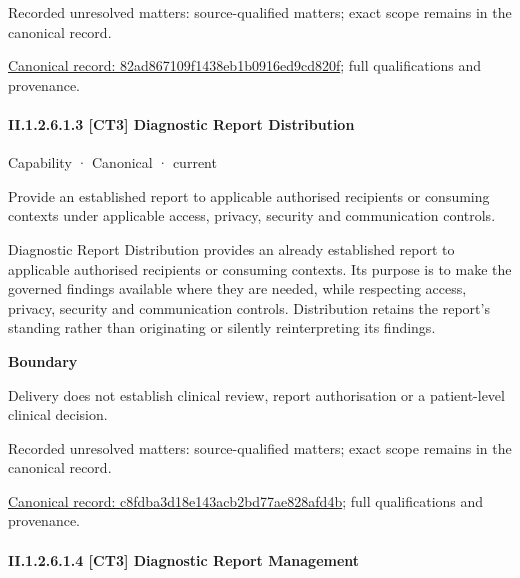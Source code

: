 {\small Recorded unresolved matters: source-qualified matters; exact scope remains in the canonical record.}\par
{\footnotesize \href{../../../../continuum/strategy/capability/82ad867109f1438eb1b0916ed9cd820f.md}{Canonical record: 82ad867109f1438eb1b0916ed9cd820f}; full qualifications and provenance.}\par
\paragraph*{II.1.2.6.1.3 [CT3] Diagnostic Report Distribution}
\label{navigation:II.1.2.6.1.3}

\label{element:c8fdba3d18e143acb2bd77ae828afd4b}
{\small Capability · Canonical · current}\par

Provide an established report to applicable authorised recipients or consuming contexts under applicable access, privacy, security and communication controls.



Diagnostic Report Distribution provides an already established report to applicable authorised recipients or consuming contexts. Its purpose is to make the governed findings available where they are needed, while respecting access, privacy, security and communication controls. Distribution retains the report's standing rather than originating or silently reinterpreting its findings.



\textbf{Boundary}



Delivery does not establish clinical review, report authorisation or a patient-level clinical decision.


{\small Recorded unresolved matters: source-qualified matters; exact scope remains in the canonical record.}\par
{\footnotesize \href{../../../../continuum/strategy/capability/c8fdba3d18e143acb2bd77ae828afd4b.md}{Canonical record: c8fdba3d18e143acb2bd77ae828afd4b}; full qualifications and provenance.}\par
\paragraph*{II.1.2.6.1.4 [CT3] Diagnostic Report Management}
\label{navigation:II.1.2.6.1.4}

